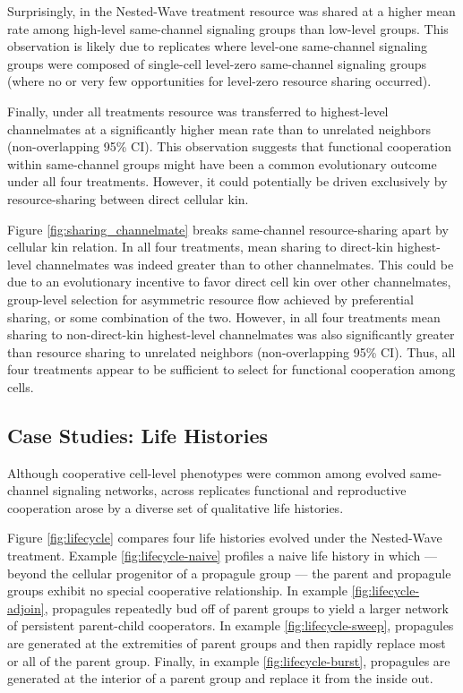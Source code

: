 Surprisingly, in the Nested-Wave treatment resource was shared at a higher mean rate among high-level same-channel signaling groups than low-level groups.
This observation is likely due to replicates where level-one same-channel signaling groups were composed of single-cell level-zero same-channel signaling groups (where no or very few opportunities for level-zero resource sharing occurred).

Finally, under all treatments resource was transferred to highest-level channelmates at a significantly higher mean rate than to unrelated neighbors (non-overlapping 95\% CI).
This observation suggests that functional cooperation within same-channel groups might have been a common evolutionary outcome under all four treatments.
However, it could potentially be driven exclusively by resource-sharing between direct cellular kin.

Figure \ref{fig:sharing_channelmate} breaks same-channel resource-sharing apart by cellular kin relation.
In all four treatments, mean sharing to direct-kin highest-level channelmates was indeed greater than to other channelmates.
This could be due to an evolutionary incentive to favor direct cell kin over other channelmates, group-level selection for asymmetric resource flow achieved by preferential sharing, or some combination of the two.
However, in all four treatments mean sharing to non-direct-kin highest-level channelmates was also significantly greater than resource sharing to unrelated neighbors (non-overlapping 95\% CI).
Thus, all four treatments appear to be sufficient to select for functional cooperation among cells.

\subsection{Case Studies: Life Histories} \label{sec:life-histories}

Although cooperative cell-level phenotypes were common among evolved same-channel signaling networks, across replicates functional and reproductive cooperation arose by a diverse set of qualitative life histories.


Figure \ref{fig:lifecycle} compares four life histories evolved under the Nested-Wave treatment.
Example \ref{fig:lifecycle-naive} profiles a naive life history in which --- beyond the cellular progenitor of a propagule group --- the parent and propagule groups exhibit no special cooperative relationship.
In example \ref{fig:lifecycle-adjoin}, propagules repeatedly bud off of parent groups to yield a larger network of persistent parent-child cooperators.
In example \ref{fig:lifecycle-sweep}, propagules are generated at the extremities of parent groups and then rapidly replace most or all of the parent group.
Finally, in example \ref{fig:lifecycle-burst}, propagules are generated at the interior of a parent group and replace it from the inside out.

